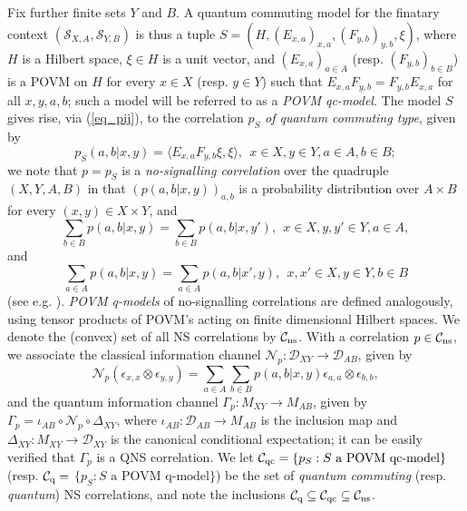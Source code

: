 \documentclass[11pt]{amsart}
\theoremstyle{definition}
\newcommand{\cl}[1]{\mathcal{#1}}
\begin{document}
Fix further finite sets $Y$ and $B$. 
A quantum commuting model for the 
finatary context $(\cl S_{X,A},\cl S_{Y,B})$ 
is thus a tuple 
$S = (H, (E_{x,a})_{x,a}, (F_{y,b})_{y,b}, \xi)$,
where $H$ is a Hilbert space, $\xi\in H$ is a unit vector, 
and $(E_{x,a})_{a\in A}$ (resp. $(F_{y,b})_{b\in B}$) is a
POVM on $H$ for every $x\in X$ (resp. $y\in Y$) such that 
$E_{x,a}F_{y,b} = F_{y,b}E_{x,a}$ for all $x,y,a,b$; 
such a model will be referred to as a \emph{POVM qc-model}. 
The model $S$ gives rise, via (\ref{eq_pij}), to 
the correlation $p_S$
\emph{of quantum commuting type}, given by 
$$p_S(a,b|x,y) = \langle E_{x,a}F_{y,b}\xi,\xi\rangle,
\ \ x\in X, y\in Y,a\in A,b\in B;$$
we note that $p = p_S$ is a \emph{no-signalling correlation}
over the quadruple $(X,Y,A,B)$ in that 
$(p(a,b|x,y))_{a,b}$ is a probability distribution over $A\times B$ for every 
$(x,y)\in X\times Y$, and
$$\sum_{b\in B} p(a,b|x,y) = \sum_{b\in B} p(a,b|x,y'), \ \ x\in X, y,y'\in Y, a\in A,$$
and 
$$\sum_{a\in A} p(a,b|x,y) = \sum_{a\in A} p(a,b|x',y), \ \ x,x'\in X,  y\in Y, b\in B$$
(see e.g. \cite{lmprsstw, psstw}). 
\emph{POVM q-models} of no-signalling correlations are defined analogously, using tensor products of POVM's acting on finite dimensional 
Hilbert spaces. 
We denote the (convex) set of all NS correlations by $\cl C_{\rm ns}$.
With a correlation $p \in \cl C_{\rm ns}$, we associate the classical information channel 
$\cl N_p : \cl D_{XY}\to \cl D_{AB}$, given by 
\begin{equation}\label{eq_Gammap}
\cl N_p(\epsilon_{x,x}\otimes\epsilon_{y,y}) = \sum_{a\in A}\sum_{b\in B} p(a,b|x,y)
\epsilon_{a,a}\otimes\epsilon_{b,b},
\end{equation}
and the quantum information channel 
$\Gamma_p : M_{XY}\to M_{AB}$, given by 
$\Gamma_p = \iota_{AB} \circ \cl N_p\circ \Delta_{XY}$,
where $\iota_{AB} : \cl D_{AB}\to M_{AB}$ is the 
inclusion map and $\Delta_{XY} : M_{XY}\to \cl D_{XY}$
is the canonical conditional expectation;
it can be easily verified that $\Gamma_p$ is a QNS correlation. 
We let 
$\cl C_{\rm qc} = \{p_S : S\mbox{ a POVM qc-model}\}$ 
(resp. 
$\cl C_{\rm q} =$ $\{p_S : S\mbox{ a POVM}$ $\mbox{q-model}\}$)
be the set of \emph{quantum commuting}
(resp. \emph{quantum}) NS correlations, and
note the inclusions
$\cl C_{\rm q}\subseteq \cl C_{\rm qc}\subseteq \cl C_{\rm ns}$.
\end{document}
